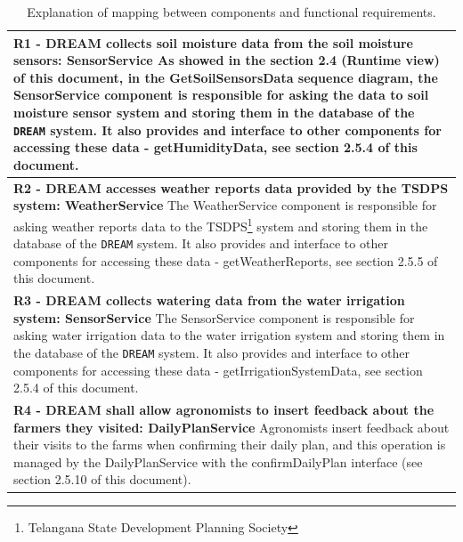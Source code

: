 \documentclass{article}
\begin{document}
\begin{longtable}[c]{|m{11.75cm}|}
\caption{Explanation of mapping between components and functional requirements.}
 \label{comp-req mapping explanation}
    \hline
    \textbf{R1 - DREAM collects soil moisture data from the soil moisture sensors: SensorService}
    \newline\newline
    As showed in the section 2.4 (Runtime view) of this document, in the GetSoilSensorsData sequence diagram, the SensorService component is responsible for asking the data to soil moisture sensor system and storing them in the database of the \verb|DREAM| system. It also provides and interface to other components for accessing these data - getHumidityData, see section 2.5.4 of this document.\\ 
    \hline
    
    \textbf{R2 - DREAM accesses weather reports data provided by the TSDPS system: WeatherService}
    \newline\newline
    The WeatherService component is responsible for asking weather reports data to the TSDPS\footnote{Telangana State Development Planning Society} system and storing them in the database of the \verb|DREAM| system. It also provides and interface to other components for accessing these data - getWeatherReports, see section 2.5.5 of this document.\\ 
    \hline
    
    \textbf{R3 - DREAM collects watering data from the water irrigation system: SensorService}
    \newline\newline
    The SensorService component is responsible for asking water irrigation data to the water irrigation system and storing them in the database of the \verb|DREAM| system. It also provides and interface to other components for accessing these data - getIrrigationSystemData, see section 2.5.4 of this document.\\ 
    \hline
    
    \textbf{R4 - DREAM shall allow agronomists to insert feedback about the farmers they
    visited: DailyPlanService}
    \newline\newline
    Agronomists insert feedback about their visits to the farms when confirming their daily plan, and this operation is managed by the DailyPlanService with the confirmDailyPlan interface (see section 2.5.10 of this document).\\
    \hline
    

\end{longtable}
\end{document}
